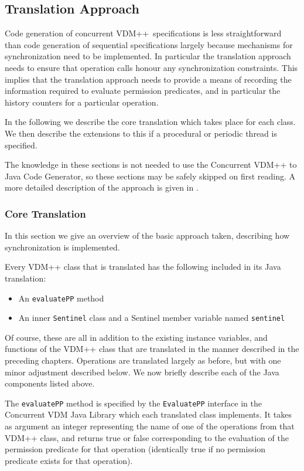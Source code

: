 \documentclass[\pformat,11pt]{article}
\newcommand{\VDM}{VDM++}
\newcommand{\cg}{VDM++ to Java Code Generator}
\newcommand{\ccg}{Concurrent \cg}
\newcommand{\CJL}{Concurrent VDM Java Library}
\begin{document}
\subsection{Translation Approach}
Code generation of concurrent \VDM\ specifications is less
straightforward than code generation of sequential specifications
largely because mechanisms for synchronization need to be
implemented. In particular the translation approach needs to ensure
that operation calls honour any synchronization constraints. This
implies that the translation approach needs to provide a means of
recording the information required to evaluate permission predicates,
and in particular the history counters for a particular operation.

In the following we describe the core translation which takes place
for each class. We then describe the extensions to this if a
procedural or periodic thread is specified.

The knowledge in these sections is not needed to use
the \ccg, so these sections may be safely skipped on first reading. A
more detailed description of the approach is given in \cite{Oppitz99-SCSK}.

\subsubsection{Core Translation}

In this section we give an overview of the basic approach taken, describing
how synchronization is implemented. 

Every VDM++ class that is translated has the following included in its
Java translation:
\begin{itemize}
\item An \texttt{evaluatePP} method
\item An inner \texttt{Sentinel} class and a Sentinel member variable
  named \texttt{sentinel}
\end{itemize}
Of course, these are all in addition to the existing instance variables,
and functions of the VDM++ class that are translated in
the manner described in the preceding chapters. Operations are
translated largely as before, but with one minor adjustment described
below. We now briefly describe each of the Java components listed
above.

The \texttt{evaluatePP} method is specified by the \texttt{EvaluatePP}
interface in the \CJL{} which each translated class implements. It
takes as argument an integer representing the name of one of the
operations from that VDM++ class, and returns true or false
corresponding to the evaluation of the permission predicate for that
operation (identically true if no permission predicate exists for that
operation). 
\end{document}
